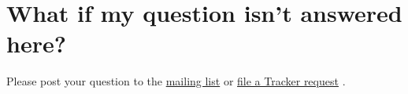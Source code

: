    \section{What if my question isn't answered here?}  
        
        Please post your question to the
        \href{http://www.ctcms.nist.gov/fipy/mail.html}{mailing list}
        \cite{FiPyMailingList} or
        \href{http://sourceforge.net/tracker/?group_id=118428}{file a
        Tracker request} \cite{FiPyBugTracker}.
